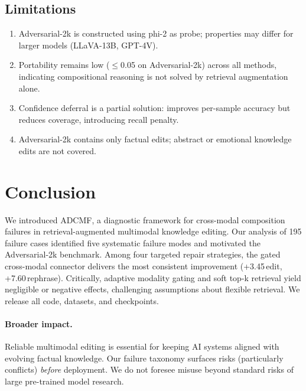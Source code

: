 \documentclass[11pt]{article}
\newcommand{\adcmf}{\textsc{ADCMF}}
\newcommand{\pp}{\,\text{pp}}
\begin{document}
\subsection{Limitations}

\begin{enumerate}[leftmargin=*,itemsep=1pt]
  \item Adversarial-2k is constructed using phi-2 as probe; properties may
    differ for larger models (LLaVA-13B, GPT-4V).
  
  \item Portability remains low ($\leq$0.05 on Adversarial-2k) across all
    methods, indicating compositional reasoning is not solved by retrieval
    augmentation alone.
  
  \item Confidence deferral is a partial solution: improves per-sample accuracy
    but reduces coverage, introducing recall penalty.
  
  \item Adversarial-2k contains only factual edits; abstract or emotional
    knowledge edits are not covered.
\end{enumerate}

\section{Conclusion}
\label{sec:conclusion}

We introduced \adcmf{}, a diagnostic framework for cross-modal composition
failures in retrieval-augmented multimodal knowledge editing. Our analysis of
195 failure cases identified five systematic failure modes and motivated the
Adversarial-2k benchmark. Among four targeted repair strategies, the gated
cross-modal connector delivers the most consistent improvement (+3.45\pp edit,
+7.60\pp rephrase). Critically, adaptive modality gating and soft top-k
retrieval yield negligible or negative effects, challenging assumptions about
flexible retrieval. We release all code, datasets, and checkpoints.

\paragraph{Broader impact.}
Reliable multimodal editing is essential for keeping AI systems aligned with
evolving factual knowledge. Our failure taxonomy surfaces risks (particularly
conflicts) \emph{before} deployment. We do not foresee misuse beyond standard
risks of large pre-trained model research.
\end{document}
